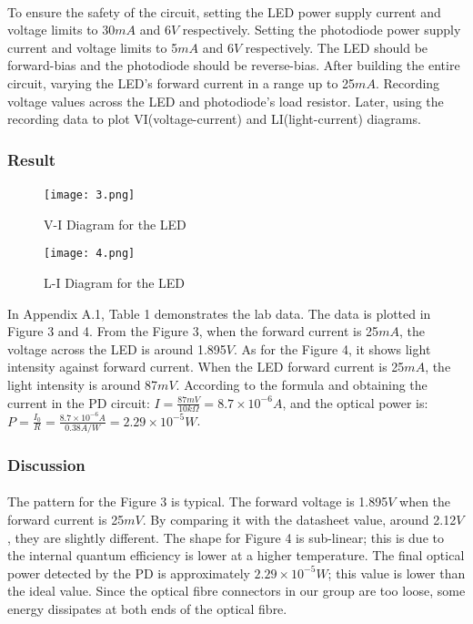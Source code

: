 \documentclass[12pt]{article}
\begin{document}
    \paragraph{}
    To ensure the safety of the circuit, setting the LED power supply current and voltage limits to 30$mA$ and 6$V$ respectively. Setting the photodiode power supply current and voltage limits to 5$mA$ and 6$V$ respectively. The LED should be forward-bias and the photodiode should be reverse-bias. After building the entire circuit, varying the LED's forward current in a range up to 25$mA$. Recording voltage values across the LED and photodiode's load resistor. Later, using the recording data to plot VI(voltage-current) and LI(light-current) diagrams. 
    
    \subsubsection{Result}
    \paragraph{}
    \begin{figure}[h]
    \centering
    \begin{minipage}[t]{0.45\textwidth}
    \centering
    \texttt{[image: 3.png]}
    \caption{V-I Diagram for the LED}
    \end{minipage}
    \begin{minipage}[t]{0.45\textwidth}
    \centering
    \texttt{[image: 4.png]}
    \caption{L-I Diagram for the LED}
    \end{minipage}
    \end{figure}
    In Appendix A.1, Table 1 demonstrates the lab data. The data is plotted in Figure 3 and 4. From the Figure 3, when the forward current is 25$mA$, the voltage across the LED is around 1.895$V$. As for the Figure 4, it shows light intensity against forward current. When the LED forward current is 25$mA$, the light intensity is around 87$mV$. According to the formula and obtaining the current in the PD circuit: $I=\frac{87mV}{10k\Omega}=8.7\times10^{-6}A$, and the optical power is: $P=\frac{I_{0}}{R}=\frac{8.7\times10^{-6}A}{0.38A/W}=2.29\times10^{-5}W$.
    
    \subsubsection{Discussion}
    \paragraph{}
    The pattern for the Figure 3 is typical. The forward voltage is 1.895$V$ when the forward current is 25$mV$. By comparing it with the datasheet value, around 2.12$V$, they are slightly different. The shape for Figure 4 is sub-linear; this is due to the internal quantum efficiency  is lower at a higher temperature. The final optical power detected by the PD is approximately $2.29\times10^{-5}W$; this value is lower than the ideal value. Since the optical fibre connectors in our group are too loose, some energy dissipates at both ends of the optical fibre.
    
\end{document}
